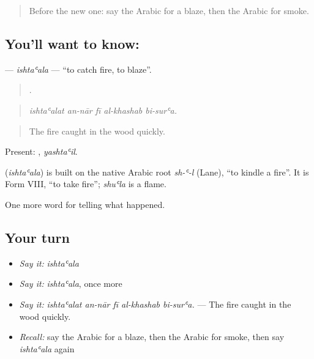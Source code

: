 \label{lesson:AR-C298-ishtaala}



\begin{quote}
Before the new one: say the Arabic for a blaze, then the Arabic for smoke.
\end{quote}

\subsection*{You'll want to know: }
\textbf{} — \emph{ishtaʿala} — \textquotedblleft{}to catch fire, to blaze\textquotedblright{}.

\begin{quote}
    .
\end{quote}

\begin{quote}
\emph{ishtaʿalat an-nār fī al-khashab bi-surʿa.}
\end{quote}

\begin{quote}
The fire caught in the wood quickly.
\end{quote}

Present: , \emph{yashtaʿil}.

\begin{cousinweb}
\textbf{} (\emph{ishtaʿala}) is built on the native Arabic root \emph{sh-ʿ-l} (Lane), \textquotedblleft{}to kindle a fire\textquotedblright{}. It is Form VIII, \textquotedblleft{}to take fire\textquotedblright{}; \emph{shuʿla} is a flame.
\end{cousinweb}

\begin{grammarlens}[title={What you've built}]
One more word for telling what happened.
\end{grammarlens}

\subsection*{Your turn}
\begin{itemize}
\raggedright
  \item \emph{Say it:} \emph{ishtaʿala}
  \item \emph{Say it:} \emph{ishtaʿala}, once more
  \item \emph{Say it:} \emph{ishtaʿalat an-nār fī al-khashab bi-surʿa.} — The fire caught in the wood quickly.
  \item \emph{Recall:} say the Arabic for a blaze, then the Arabic for smoke, then say \emph{ishtaʿala} again
\end{itemize}

